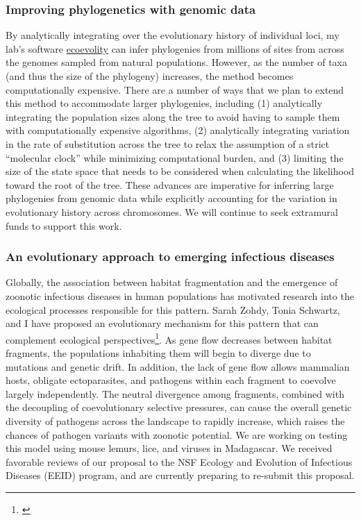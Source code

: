 \subsubsection*{Improving phylogenetics with genomic data}
By analytically integrating over the evolutionary history of individual loci,
my lab's software
\href{http://phyletica.org/ecoevolity/}{ecoevolity}
can infer phylogenies from millions of sites from across the genomes sampled
from natural populations.
However, as the number of taxa (and thus the size of the phylogeny) increases,
the method becomes computationally expensive.
There are a number of ways that we plan to extend this method to accommodate
larger phylogenies, including
(1) analytically integrating the population sizes along the tree to
avoid having to sample them with computationally expensive algorithms,
(2) analytically integrating variation in the rate of substitution
across the tree to relax the assumption of a strict ``molecular clock'' while
minimizing computational burden,
and
(3) limiting the size of the state space that needs to be considered when
calculating the likelihood toward the root of the tree.
These advances are imperative for inferring large phylogenies from genomic data
while explicitly accounting for the variation in evolutionary history across
chromosomes.
We will continue to seek extramural funds to support this work.

\subsubsection*{An evolutionary approach to emerging infectious diseases}
Globally, the association between habitat fragmentation and the emergence of
zoonotic infectious diseases in human populations has motivated research into
the ecological processes responsible for this pattern.
Sarah Zohdy, Tonia Schwartz, and I have proposed an evolutionary mechanism for
this pattern that can complement ecological
perspectives\footnote{\label{Zohdy19}\hspace{-0.6em}}.
As gene flow decreases between habitat fragments, the populations inhabiting
them will begin to diverge due to mutations and genetic drift.
In addition, the lack of gene flow allows mammalian hosts, obligate
ectoparasites, and pathogens within each fragment to coevolve largely
independently.
The neutral divergence among fragments, combined with the decoupling of
coevolutionary selective pressures, can cause the overall genetic
diversity of pathogens across the landscape to rapidly increase,
which raises the chances of pathogen variants with zoonotic potential.
We are working on testing this model using mouse lemurs, lice, and viruses in
Madagascar.
We received favorable reviews of our proposal to the NSF Ecology and Evolution
of Infectious Diseases (EEID) program,
and are currently preparing to re-submit this proposal. %

